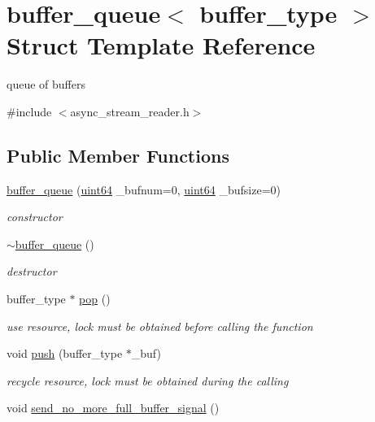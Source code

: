 \hypertarget{structbuffer__queue}{}\section{buffer\+\_\+queue$<$ buffer\+\_\+type $>$ Struct Template Reference}
\label{structbuffer__queue}


queue of buffers  




{\ttfamily \#include $<$async\+\_\+stream\+\_\+reader.\+h$>$}

\subsection*{Public Member Functions}
\begin{DoxyCompactItemize}
\item 
\hyperlink{structbuffer__queue_acd123387742f7cc4e1e418e7864ca2a1}{buffer\+\_\+queue} (\hyperlink{types_8h_a60e8696a4678cd348e991a1f172e53f7}{uint64} \+\_\+bufnum=0, \hyperlink{types_8h_a60e8696a4678cd348e991a1f172e53f7}{uint64} \+\_\+bufsize=0)
\begin{DoxyCompactList}\small\item\em constructor \end{DoxyCompactList}\item 
\hyperlink{structbuffer__queue_a8dda78874230bead5795e510f315dc2c}{$\sim$buffer\+\_\+queue} ()
\begin{DoxyCompactList}\small\item\em destructor \end{DoxyCompactList}\item 
buffer\+\_\+type $\ast$ \hyperlink{structbuffer__queue_ab26cbb480e9a300a4a021f4be1bb2735}{pop} ()
\begin{DoxyCompactList}\small\item\em use resource, lock must be obtained before calling the function \end{DoxyCompactList}\item 
void \hyperlink{structbuffer__queue_a13c104db4054ca0cb59b5e0502267d55}{push} (buffer\+\_\+type $\ast$\+\_\+buf)
\begin{DoxyCompactList}\small\item\em recycle resource, lock must be obtained during the calling \end{DoxyCompactList}\item 
void \hyperlink{structbuffer__queue_a487335f8827c09d4d76d588e47d633ac}{send\+\_\+no\+\_\+more\+\_\+full\+\_\+buffer\+\_\+signal} ()

\end{DoxyCompactItemize}
